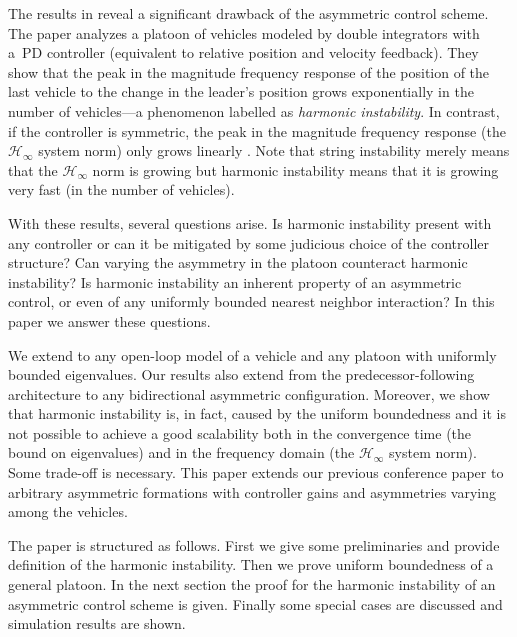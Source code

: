 \documentclass[technote, 10pt, twoside]{IEEEtran}
\theoremstyle{plain}
\theoremstyle{definition}
\theoremstyle{assump}
\begin{document}
The results in \cite{Tangerman2012} reveal a significant drawback of the
asymmetric control scheme. The paper analyzes a platoon of vehicles modeled by
double integrators with a~PD controller (equivalent to relative position and
velocity feedback). They show that the peak in the magnitude frequency response
of the position of the last vehicle to the change in the leader's position grows
exponentially in the number of vehicles---a phenomenon labelled as
\textit{harmonic instability}. In contrast, if the controller is symmetric, the
peak in the magnitude frequency response (the $\mathcal{H}_\infty$ system norm)
only grows linearly \cite{Veerman2007}. 
Note that string instability merely means that the
$\mathcal{H}_\infty$ norm is growing but harmonic instability means that it is
growing very fast (in the number of vehicles).

With these results, several questions arise. Is harmonic instability present
with any controller or can it be mitigated by some judicious choice of the
controller structure? Can varying the asymmetry in the platoon counteract
harmonic instability? Is harmonic instability an inherent property of an
asymmetric control, or even of any uniformly bounded nearest neighbor
interaction? In this paper we answer these questions.

We extend \cite{Tangerman2012} to any open-loop model of a vehicle and any
platoon with uniformly bounded eigenvalues. Our results also extend
\cite{Seiler2004a} from the predecessor-following architecture to any
bidirectional asymmetric configuration. Moreover, we show that harmonic
instability is, in fact, caused by the uniform boundedness and it is not
possible to achieve a good scalability both in the convergence time (the bound
on eigenvalues) and in the frequency domain (the $\mathcal{H}_\infty$ system
norm). Some trade-off is necessary. This paper extends our previous conference
paper \cite{Herman2014} to arbitrary asymmetric formations with controller gains
and asymmetries varying among the vehicles.

The paper is structured as follows. First we give some preliminaries and provide definition of the harmonic instability. Then we prove uniform boundedness of a general
platoon. In the next section the proof for the harmonic instability of an asymmetric control scheme is given. Finally some special cases are discussed and simulation results are shown.
\end{document}
